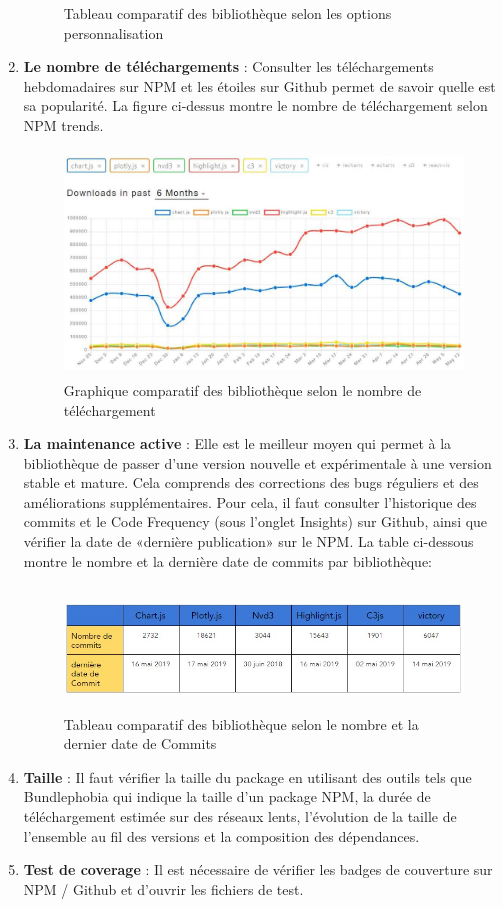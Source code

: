 \documentclass[french, a4paper, 12pt]{report}
\begin{document}
\begin{enumerate}
\begin{figure}[!ht]
    \caption{Tableau comparatif des bibliothèque selon les options personnalisation}
    \label{fig:3.2}
\end{figure}
  \item \textbf{Le nombre de téléchargements} : Consulter les téléchargements hebdomadaires sur NPM et les étoiles sur Github permet de savoir quelle est sa popularité.  La figure ci-dessus montre le nombre de téléchargement selon NPM trends. 
   \begin{figure}[!ht]
    \centering
    \includegraphics[height=6cm]{images/npm-trends-chart.jpg}
    \caption{Graphique comparatif des bibliothèque selon le nombre de téléchargement }
    \label{fig:3.3}
\end{figure}
  \item \textbf{ La maintenance active} : Elle est le meilleur moyen qui permet à la bibliothèque de passer d’une version nouvelle et expérimentale à une version stable et mature. Cela comprends des corrections des bugs réguliers et des améliorations supplémentaires. Pour cela, il faut consulter l'historique des commits et le Code Frequency (sous l'onglet Insights) sur Github, ainsi que vérifier la date de «dernière publication» sur le NPM. La table ci-dessous montre le nombre et la dernière date de commits par bibliothèque:
  \begin{figure}[!ht]
    \centering
    \includegraphics[height=3.3cm]{images/commit-table.jpg}
    \caption{Tableau comparatif des bibliothèque selon le nombre et la dernier date de Commits }
    \label{fig:3.4}
\end{figure}
  \item \textbf{Taille} : Il faut vérifier la taille du package en utilisant des outils tels que Bundlephobia qui indique la taille d'un package NPM, la durée de téléchargement estimée sur des réseaux lents, l'évolution de la taille de l'ensemble au fil des versions et la composition des dépendances.
  \item \textbf{Test de coverage} : Il est nécessaire de vérifier les badges de couverture sur NPM / Github et d’ouvrir les fichiers de test.
\end{enumerate}
\end{document}
